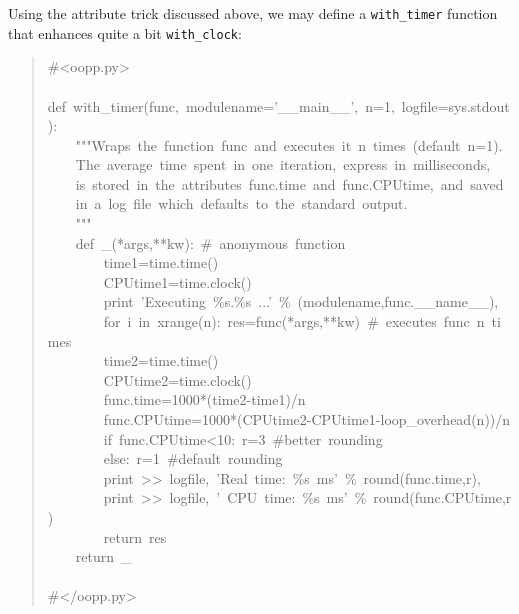 \documentclass[10pt,english]{article}
\begin{document}
Using the attribute trick discussed above, we may
define a \texttt{with{\_}timer} function that enhances quite a bit 
\texttt{with{\_}clock}:
\begin{quote}
\begin{ttfamily}\begin{flushleft}
\mbox{{\#}<oopp.py>}\\
\mbox{}\\
\mbox{def~with{\_}timer(func,~modulename='{\_}{\_}main{\_}{\_}',~n=1,~logfile=sys.stdout):}\\
\mbox{~~~~"""Wraps~the~function~func~and~executes~it~n~times~(default~n=1).~}\\
\mbox{~~~~The~average~time~spent~in~one~iteration,~express~in~milliseconds,~}\\
\mbox{~~~~is~stored~in~the~attributes~func.time~and~func.CPUtime,~and~saved~}\\
\mbox{~~~~in~a~log~file~which~defaults~to~the~standard~output.}\\
\mbox{~~~~"""}\\
\mbox{~~~~def~{\_}(*args,**kw):~{\#}~anonymous~function}\\
\mbox{~~~~~~~~time1=time.time()}\\
\mbox{~~~~~~~~CPUtime1=time.clock()}\\
\mbox{~~~~~~~~print~'Executing~{\%}s.{\%}s~...'~{\%}~(modulename,func.{\_}{\_}name{\_}{\_}),}\\
\mbox{~~~~~~~~for~i~in~xrange(n):~res=func(*args,**kw)~{\#}~executes~func~n~times}\\
\mbox{~~~~~~~~time2=time.time()}\\
\mbox{~~~~~~~~CPUtime2=time.clock()}\\
\mbox{~~~~~~~~func.time=1000*(time2-time1)/n}\\
\mbox{~~~~~~~~func.CPUtime=1000*(CPUtime2-CPUtime1-loop{\_}overhead(n))/n}\\
\mbox{~~~~~~~~if~func.CPUtime<10:~r=3~{\#}better~rounding}\\
\mbox{~~~~~~~~else:~r=1~{\#}default~rounding}\\
\mbox{~~~~~~~~print~>>~logfile,~'Real~time:~{\%}s~ms'~{\%}~round(func.time,r),}\\
\mbox{~~~~~~~~print~>>~logfile,~'~CPU~time:~{\%}s~ms'~{\%}~round(func.CPUtime,r)}\\
\mbox{~~~~~~~~return~res}\\
\mbox{~~~~return~{\_}}\\
\mbox{}\\
\mbox{{\#}</oopp.py>}
\end{flushleft}\end{ttfamily}
\end{quote}
\end{document}
